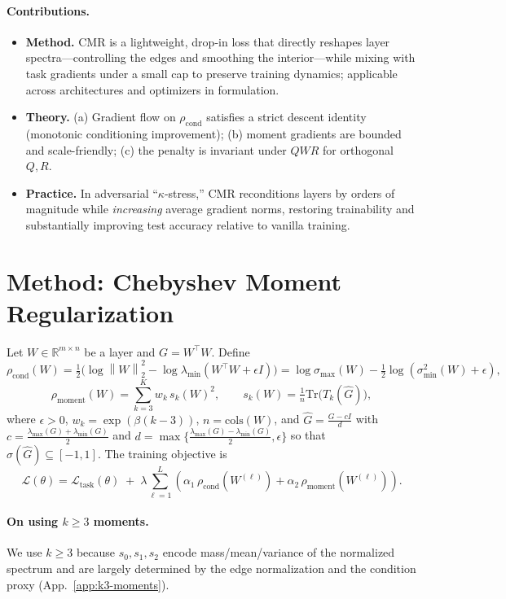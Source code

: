 \documentclass{opt2025}
\newcommand{\R}{\mathbb{R}}
\newcommand{\Tr}{\mathrm{Tr}}
\newcommand{\norm}[1]{\left\lVert #1 \right\rVert}
\newcommand{\Ghat}{\widehat{G}}
\newcommand{\condproxy}{\rho_{\text{cond}}}
\newcommand{\momentproxy}{\rho_{\text{moment}}}
\newcommand{\cmr}{\textsc{CMR}\xspace}
\begin{document}
\paragraph{Contributions.}
\begin{itemize}
\item \textbf{Method.} \cmr is a lightweight, drop-in loss that directly reshapes layer spectra—controlling the edges and smoothing the interior—while mixing with task gradients under a small cap to preserve training dynamics; applicable across architectures and optimizers in formulation.
\item \textbf{Theory.} (a) Gradient flow on $\condproxy$ satisfies a strict descent identity (monotonic conditioning improvement); (b) moment gradients are bounded and scale-friendly; (c) the penalty is invariant under $QWR$ for orthogonal $Q,R$.
\item \textbf{Practice.} In adversarial ``$\kappa$-stress,'' \cmr reconditions layers by orders of magnitude while \emph{increasing} average gradient norms, restoring trainability and substantially improving test accuracy relative to vanilla training.
\end{itemize}

\section{Method: Chebyshev Moment Regularization}
\label{sec:method}
Let $W\in\R^{m\times n}$ be a layer and $G=W^\top W$. Define
\[
\condproxy(W) = \tfrac12\Big(\log\norm{W}_2^2 - \log\lambda_{\min}(W^\top W + \epsilon I)\Big)
= \log\sigma_{\max}(W) - \tfrac12 \log(\sigma_{\min}^2(W)+\epsilon),\label{eq:condproxy}
\]
\[
\momentproxy(W) = \sum_{k=3}^{K} w_k\, s_k(W)^2,\qquad
s_k(W)=\tfrac1n \Tr\!\big(T_k(\Ghat)\big),\label{eq:momentproxy}
\]
where $\epsilon>0$, $w_k=\exp(\beta(k-3))$, $n=\text{cols}(W)$, and $\Ghat=\frac{G-cI}{d}$ with
$c=\frac{\lambda_{\max}(G)+\lambda_{\min}(G)}{2}$ and $d=\max\{\frac{\lambda_{\max}(G)-\lambda_{\min}(G)}{2},\epsilon\}$ so that $\sigma(\Ghat)\subseteq[-1,1]$. The training objective is
\[
\mathcal{L}(\theta)
= \mathcal{L}_{\text{task}}(\theta)\;+\;\lambda \sum_{\ell=1}^L \left(\alpha_1\,\condproxy(W^{(\ell)}) + \alpha_2\,\momentproxy(W^{(\ell)})\right).
\]
\paragraph{On using $k\ge3$ moments.}
We use $k\!\ge\!3$ because $s_0,s_1,s_2$ encode mass/mean/variance of the normalized spectrum and are largely determined by the edge normalization and the condition proxy (App.~\ref{app:k3-moments}).
\end{document}
